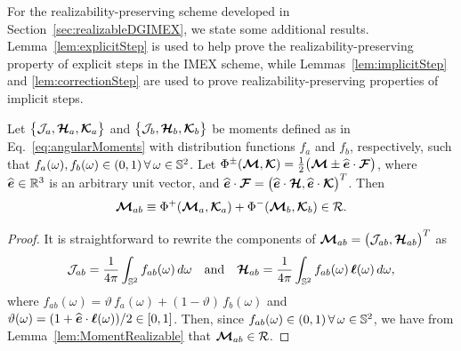 For the realizability-preserving scheme developed in Section~\ref{sec:realizableDGIMEX}, we state some additional results.  
Lemma~\ref{lem:explicitStep} is used to help prove the realizability-preserving property of explicit steps in the IMEX scheme, while Lemmas~\ref{lem:implicitStep} and \ref{lem:correctionStep} are used to prove realizability-preserving properties of implicit steps.  
\begin{lemma}
  Let $\big\{\mathcal{J}_{a},\boldsymbol{\mathcal{H}}_{a},\boldsymbol{\mathcal{K}}_{a}\big\}$ and $\big\{\mathcal{J}_{b},\boldsymbol{\mathcal{H}}_{b},\boldsymbol{\mathcal{K}}_{b}\big\}$ be moments defined as in Eq.~\eqref{eq:angularMoments} with distribution functions $f_{a}$ and $f_{b}$, respectively, such that $f_{a}(\omega),f_{b}(\omega)\in(0,1)\,\forall\,\omega\in\mathbb{S}^{2}$.  
  Let $\Phi^{\pm}(\boldsymbol{\mathcal{M}},\boldsymbol{\mathcal{K}})=\frac{1}{2}\big(\boldsymbol{\mathcal{M}}\pm\widehat{\boldsymbol{e}}\cdot\boldsymbol{\mathcal{F}}\big)$, where $\widehat{\boldsymbol{e}}\in\mathbb{R}^{3}$ is an arbitrary unit vector, and $\widehat{\boldsymbol{e}}\cdot\boldsymbol{\mathcal{F}}=\big(\widehat{\boldsymbol{e}}\cdot\boldsymbol{\mathcal{H}},\widehat{\boldsymbol{e}}\cdot\boldsymbol{\mathcal{K}}\big)^{T}$.  
  Then
  \begin{equation*}
    \boldsymbol{\mathcal{M}}_{ab} \equiv \Phi^{+}(\boldsymbol{\mathcal{M}}_{a},\boldsymbol{\mathcal{K}}_{a})+\Phi^{-}(\boldsymbol{\mathcal{M}}_{b},\boldsymbol{\mathcal{K}}_{b})\in\mathcal{R}.
  \end{equation*}
  \label{lem:explicitStep}
\end{lemma}
\begin{proof}
  It is straightforward to rewrite the components of $\boldsymbol{\mathcal{M}}_{ab}= \big(\mathcal{J}_{ab},\boldsymbol{\mathcal{H}}_{ab}\big)^{T}$ as
  \begin{equation*}
    \mathcal{J}_{ab}=\frac{1}{4\pi}\int_{\mathbb{S}^{2}}f_{ab}(\omega)\,d\omega
    \quad\text{and}\quad
    \boldsymbol{\mathcal{H}}_{ab}=\frac{1}{4\pi}\int_{\mathbb{S}^{2}}f_{ab}(\omega)\,\boldsymbol{\ell}(\omega)\,d\omega,
  \end{equation*}
  where $f_{ab}(\omega)=\vartheta\,f_{a}(\omega)+(1-\vartheta)\,f_{b}(\omega)$ and $\vartheta(\omega)=(1+\widehat{\boldsymbol{e}}\cdot\boldsymbol{\ell}(\omega))/2\in[0,1]$.  
  Then, since $f_{ab}(\omega)\in(0,1)\,\forall\,\omega\in\mathbb{S}^{2}$, we have from Lemma~\ref{lem:MomentRealizable} that $\boldsymbol{\mathcal{M}}_{ab}\in\mathcal{R}$.  
\end{proof}


